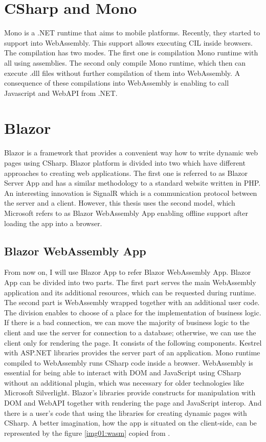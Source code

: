 \section{CSharp and Mono}

Mono is a .NET runtime that aims to mobile platforms. 
Recently, they started to support \cite{compilation} into WebAssembly.
This support allows executing CIL inside browsers.
The compilation has two modes.
The first one is compilation Mono runtime with all using assemblies.
The second only compile Mono runtime, which then can execute .dll files without further compilation of them into WebAssembly.
A consequence of these compilations into WebAssembly is enabling to call Javascript and WebAPI from .NET.

\section{Blazor}

Blazor is a framework that provides a convenient way how to write dynamic web pages using CSharp.
Blazor platform is divided into two \cite{Hosting_models} which have different approaches to creating web applications. 
The first one is referred to as Blazor Server App and has a similar methodology to a standard website written in PHP.
An interesting innovation is SignalR which is a communication protocol between the server and a client.
However, this thesis uses the second model, which Microsoft refers to as Blazor WebAssembly App enabling offline support after loading the app into a browser.

\subsection{Blazor WebAssembly App}
From now on, I will use Blazor App to refer Blazor WebAssembly App.
Blazor App can be divided into two parts.
The first part serves the main WebAssembly application and its additional resources, which can be requested during runtime.
The second part is WebAssembly wrapped together with an additional user code.
The division enables to choose of a place for the implementation of business logic.
If there is a bad connection, we can move the majority of business logic to the client and use the server for connection to a database; otherwise, we can use the client only for rendering the page. It consists of the following components. 
Kestrel with ASP.NET libraries provides the server part of an application.
Mono runtime compiled to WebAssembly runs CSharp code inside a browser.
WebAssembly is essential for being able to interact with DOM and JavaScript using CSharp without an additional plugin, which was necessary for older technologies like Microsoft Silverlight.
Blazor's libraries provide constructs for manipulation with DOM and WebAPI together with rendering the page and JavaScript interop.
And there is a user's code that using the libraries for creating dynamic pages with CSharp.
A better imagination, how the app is situated on the client-side, can be represented by the figure \ref{img01:wasm} copied from \cite{Glick2018}.

